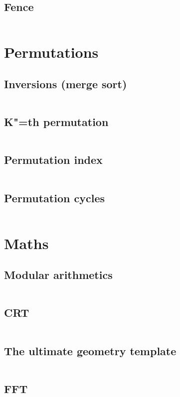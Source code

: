 ﻿\documentclass[10pt,twocolumn,oneside]{article}
\begin{document}
\subsection{Fence}
\inputminted[breaklines]{cpp}{DP/fence.cpp}

\section{Permutations}
\subsection{Inversions (merge sort)}
\inputminted[breaklines]{cpp}{Permutations/inversions.cpp}
\subsection{K"=th permutation}
\inputminted[breaklines]{cpp}{Permutations/k-th permutation.cpp}
\subsection{Permutation index}
\inputminted[breaklines]{python}{Permutations/permutation number.py}
\subsection{Permutation cycles}
\inputminted[breaklines]{cpp}{Permutations/permutation cycles.cpp}

\section{Maths}
\subsection{Modular arithmetics}
\inputminted[breaklines]{cpp}{Maths/modular arithmetics.cpp}
\subsection{CRT}
\inputminted[breaklines]{python}{Maths/crt.py}
\subsection{The ultimate geometry template}
\inputminted[breaklines]{python}{Maths/geometry.py}
\subsection{FFT}
\inputminted[breaklines]{python}{Maths/fft.py}
\end{document}
